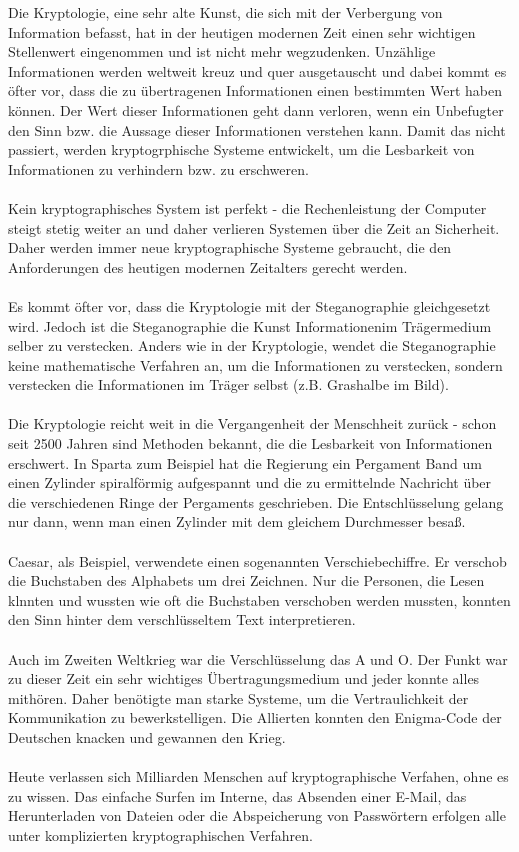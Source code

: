 \documentclass[12pt,a4paper]{report}
\begin{document}
Die Kryptologie, eine sehr alte Kunst, die sich mit der Verbergung von Information befasst, hat in der heutigen modernen Zeit einen sehr wichtigen Stellenwert eingenommen und ist nicht mehr wegzudenken. Unzählige Informationen werden weltweit kreuz und quer ausgetauscht und dabei kommt es öfter vor, dass die zu übertragenen Informationen einen bestimmten Wert haben können. Der Wert dieser Informationen geht dann verloren, wenn ein Unbefugter den Sinn bzw. die Aussage dieser Informationen verstehen kann. Damit das nicht passiert, werden kryptogrphische Systeme entwickelt, um die Lesbarkeit von Informationen zu verhindern bzw. zu erschweren.\\\\
Kein kryptographisches System ist perfekt - die Rechenleistung der Computer steigt stetig weiter an und daher verlieren Systemen über die Zeit an Sicherheit. Daher werden immer neue kryptographische Systeme gebraucht, die den Anforderungen des heutigen modernen Zeitalters gerecht werden.\\\\
Es kommt öfter vor, dass die Kryptologie mit der Steganographie gleichgesetzt wird. Jedoch ist die Steganographie die Kunst Informationenim Trägermedium selber zu verstecken. Anders wie in der Kryptologie, wendet die Steganographie keine mathematische Verfahren an, um die Informationen zu verstecken, sondern verstecken die Informationen im Träger selbst (z.B. Grashalbe im Bild).\\\\
Die Kryptologie reicht weit in die Vergangenheit der Menschheit zurück - schon seit 2500 Jahren sind Methoden bekannt, die die Lesbarkeit von Informationen erschwert. In Sparta zum Beispiel hat die Regierung ein Pergament Band um einen Zylinder spiralförmig aufgespannt und die zu ermittelnde Nachricht über die verschiedenen Ringe der Pergaments geschrieben. Die Entschlüsselung gelang nur dann, wenn man einen Zylinder mit dem gleichem Durchmesser besaß.\\\\
Caesar, als Beispiel, verwendete einen sogenannten Verschiebechiffre. Er verschob die Buchstaben des Alphabets um drei Zeichnen. Nur die Personen, die Lesen klnnten und wussten wie oft die Buchstaben verschoben werden mussten, konnten den Sinn hinter dem verschlüsseltem Text interpretieren.\\\\
Auch im Zweiten Weltkrieg war die Verschlüsselung das A und O. Der Funkt war zu dieser Zeit ein sehr wichtiges Übertragungsmedium und jeder konnte alles mithören. Daher benötigte man starke Systeme, um die Vertraulichkeit der Kommunikation zu bewerkstelligen. Die Allierten konnten den Enigma-Code der Deutschen knacken und gewannen den Krieg.\\\\
Heute verlassen sich Milliarden Menschen auf kryptographische Verfahen, ohne es zu wissen. Das einfache Surfen im Interne, das Absenden einer E-Mail, das Herunterladen von Dateien oder die Abspeicherung von Passwörtern erfolgen alle unter komplizierten kryptographischen Verfahren.
\end{document}
